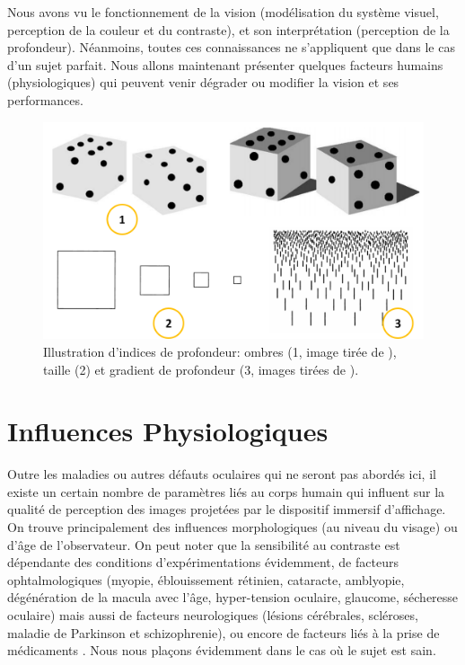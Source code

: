 	\par Nous avons vu le fonctionnement de la vision (modélisation du système visuel, perception de la couleur et du contraste), et son interprétation (perception de la profondeur). Néanmoins, toutes ces connaissances ne s'appliquent que dans le cas d'un sujet parfait. Nous allons maintenant présenter quelques facteurs humains (physiologiques) qui peuvent venir dégrader ou modifier la vision et ses performances.	
	
	\begin{figure}
		\centering
		\includegraphics[scale=.25]{Figures/PerspectivesProfondeur}
		\caption{Illustration d'indices de profondeur: ombres (1, image tirée de \citep{anses_effets_2014}), taille (2) et gradient de profondeur (3, images tirées de \citep{glassner_principles_1995}).}
		\label{fig:profondeur_perspectives}
	\end{figure}
	
\chapter{Influences Physiologiques}
	\par Outre les maladies ou autres défauts oculaires qui ne seront pas abordés ici, il existe un certain nombre de paramètres liés au corps humain qui influent sur la qualité de perception des images projetées par le dispositif immersif d'affichage. On trouve principalement des influences morphologiques (au niveau du visage) ou d'âge de l'observateur. On peut noter que la sensibilité au contraste est dépendante des conditions d'expérimentations évidemment, de facteurs ophtalmologiques (myopie, éblouissement rétinien, cataracte, amblyopie, dégénération de la macula avec l'âge, hyper-tension oculaire, glaucome, sécheresse oculaire) mais aussi de facteurs neurologiques (lésions cérébrales, scléroses, maladie de Parkinson et schizophrenie), ou encore de facteurs liés à la prise de médicaments \citep{pelli_measuring_2013}. Nous nous plaçons évidemment dans le cas où le sujet est sain.
		
